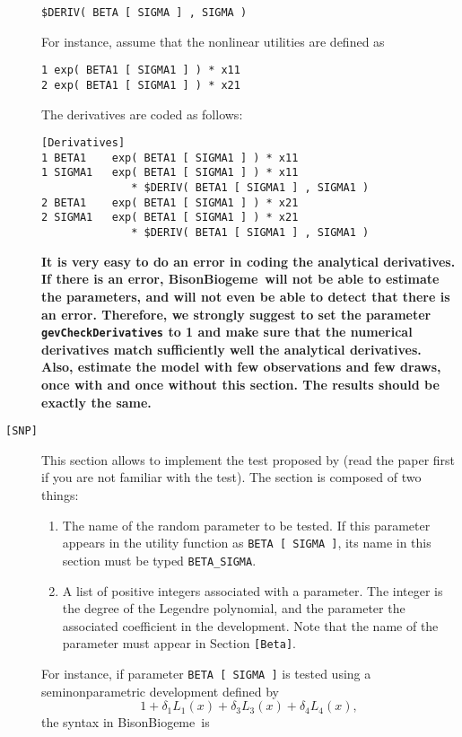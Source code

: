 \documentclass[12pt,a4paper]{article}
\newcommand{\specitem}[1]{\texttt{[#1]}}
\newcommand{\BBIOGEME}{BisonBiogeme}
\begin{document}
\begin{description}
\begin{verbatim}
$DERIV( BETA [ SIGMA ] , SIGMA )
\end{verbatim}

For instance, assume that the nonlinear utilities are defined as
\begin{verbatim}
1 exp( BETA1 [ SIGMA1 ] ) * x11
2 exp( BETA1 [ SIGMA1 ] ) * x21
\end{verbatim}
The derivatives are coded as follows:
\begin{verbatim}
[Derivatives]
1 BETA1    exp( BETA1 [ SIGMA1 ] ) * x11
1 SIGMA1   exp( BETA1 [ SIGMA1 ] ) * x11 
              * $DERIV( BETA1 [ SIGMA1 ] , SIGMA1 )
2 BETA1    exp( BETA1 [ SIGMA1 ] ) * x21
2 SIGMA1   exp( BETA1 [ SIGMA1 ] ) * x21 
              * $DERIV( BETA1 [ SIGMA1 ] , SIGMA1 )
\end{verbatim}

\textbf{It is very easy to do an error in coding the analytical
derivatives. If there is an error, \BBIOGEME\ will not be able to
estimate the parameters, and will not even be able to detect that
there is an error. Therefore, we strongly suggest to set the parameter
\texttt{gevCheckDerivatives} to 1 and make
sure that the numerical derivatives match sufficiently well the
analytical derivatives. Also, estimate the model with few observations
and few draws, once with and once without this section. The results
should be exactly the same.}

\item[\specitem{SNP}] This section allows to implement the test proposed by  (read the paper first if you are not familiar with the test). 
The section is composed of two things:
\begin{enumerate}
\item The name of the random parameter to be tested.  If this parameter appears in the
            utility function as \verb+BETA [ SIGMA ]+, its name in this section must be typed  \verb+BETA_SIGMA+. 
\item A list of positive integers associated with a parameter. The integer is the degree of the Legendre polynomial, and the parameter the associated coefficient in the development. Note that the name of the parameter must appear in Section \verb+[Beta]+.
\end{enumerate}

For instance, if parameter \verb+BETA [ SIGMA ]+ is tested using a seminonparametric development defined by
\[
1 + \delta_1 L_1(x) + \delta_3 L_3(x) + \delta_4 L_4(x),
\]
the syntax in \BBIOGEME\ is


\end{description}
\end{document}
